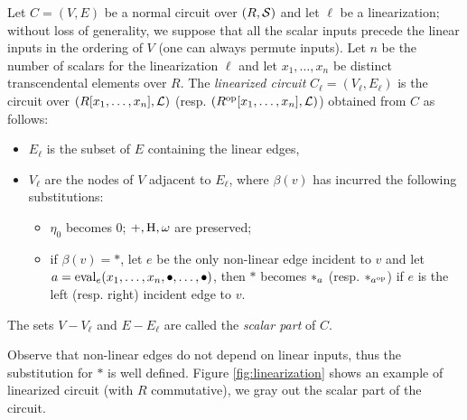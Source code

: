 \begin{definition}
  Let $C=(V,E)$ be a normal circuit over $(R,\mathcal{S})$ and let $\ell$
  be a linearization; without loss of generality, we suppose that all
  the scalar inputs precede the linear inputs in the ordering of $V$
  (one can always permute inputs). Let $n$ be the number of scalars
  for the linearization $\ell$ and let $x_1,\ldots,x_n$ be distinct
  transcendental elements over $R$. The \emph{linearized circuit}
  $C_\ell=(V_\ell,E_\ell)$ is the circuit over $(R[x_1,\ldots,x_n],
  \mathcal{L})$ (resp. $(R^{\mathrm{op}}[x_1,\ldots,x_n],\mathcal{L})$) obtained from
  $C$ as follows:
  \begin{itemize}
  \item $E_\ell$ is the subset of $E$ containing the linear edges,
  \item $V_\ell$ are the nodes of $V$ adjacent to $E_\ell$, where
    $\beta(v)$ has incurred the following substitutions:
    \begin{itemize}
    \item $\eta_0$ becomes $0$; $+, \operatorname{H}, \omega$ are preserved;
    \item if $\beta(v)=*$, let $e$ be the only non-linear edge
      incident to $v$ and let
      $a=\operatorname{eval}_e(x_1,\ldots,x_n,\bullet,\ldots,\bullet)$, then $*$
      becomes $*_{a}$ (resp. $*_{a^{\mathrm{op}}}$) if $e$ is the left
      (resp. right) incident edge to $v$.
    \end{itemize}
  \end{itemize}

  The sets $V-V_\ell$ and $E-E_\ell$ are called the \emph{scalar part}
  of $C$.
\end{definition}

Observe that non-linear edges do not depend on linear inputs, thus the
substitution for $*$ is well defined. Figure \ref{fig:linearization}
shows an example of linearized circuit (with $R$ commutative), we gray
out the scalar part of the circuit.

